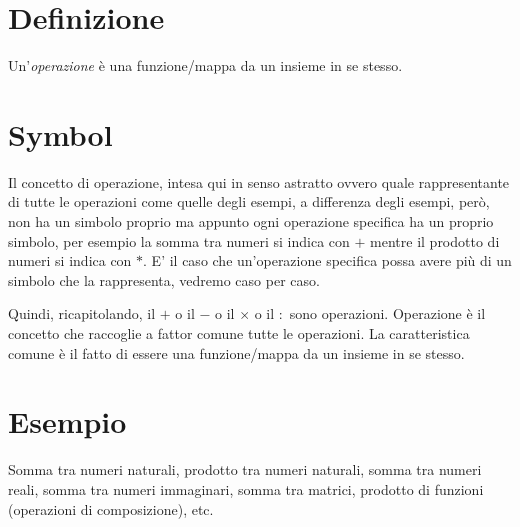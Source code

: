 
\section{Definizione}
Un'\textit{operazione} è una funzione/mappa da un insieme in se stesso. 

\section{Symbol}
Il concetto di operazione, intesa qui in senso astratto ovvero quale rappresentante di tutte le operazioni come quelle degli esempi, a differenza degli esempi, però, non ha un simbolo proprio ma appunto
ogni operazione specifica ha un proprio simbolo, per esempio la somma tra numeri si indica con $+$ mentre il prodotto di numeri si indica con $*$. E' il caso che un'operazione
specifica possa avere più di un simbolo che la rappresenta, vedremo caso per caso.

Quindi, ricapitolando, il $+$ o il $-$ o il $\times$ o il $:$ sono operazioni. Operazione è il concetto che raccoglie a fattor comune tutte le operazioni. La caratteristica comune
è il fatto di essere una funzione/mappa da un insieme in se stesso.

\section{Esempio}
Somma tra numeri naturali, prodotto tra numeri naturali, somma tra numeri reali, somma tra numeri immaginari, somma tra matrici, prodotto di funzioni (operazioni di composizione), etc.


